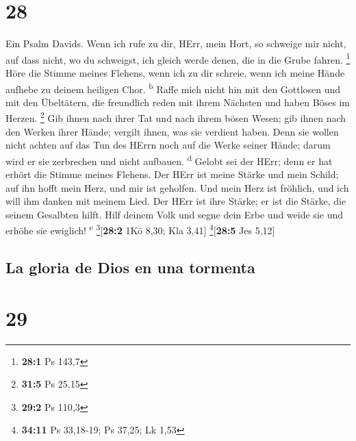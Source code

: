 \hypertarget{section-27}{%
\section{28}\label{section-27}}

 Ein Psalm Davids. Wenn ich rufe zu dir, HErr, mein Hort,
so schweige mir nicht, auf dass nicht, wo du schweigst, ich gleich werde
denen, die in die Grube fahren. \footnote{\textbf{28:1} Ps 143,7}
 Höre die Stimme meines Flehens, wenn ich zu dir schreie,
wenn ich meine Hände aufhebe zu deinem heiligen Chor.
\textsuperscript{b}  Raffe mich nicht hin mit den
Gottlosen und mit den Übeltätern, die freundlich reden mit ihrem
Nächsten und haben Böses im Herzen. \footnote{\textbf{31:5} Ps 25,15}
 Gib ihnen nach ihrer Tat und nach ihrem bösen Wesen; gib
ihnen nach den Werken ihrer Hände; vergilt ihnen, was sie verdient
haben.  Denn sie wollen nicht achten auf das Tun des HErrn
noch auf die Werke seiner Hände; darum wird er sie zerbrechen und nicht
aufbauen. \textsuperscript{d}  Gelobt sei der HErr; denn
er hat erhört die Stimme meines Flehens.  Der HErr ist
meine Stärke und mein Schild; auf ihn hofft mein Herz, und mir ist
geholfen. Und mein Herz ist fröhlich, und ich will ihm danken mit meinem
Lied.  Der HErr ist ihre Stärke; er ist die Stärke, die
seinem Gesalbten hilft.  Hilf deinem Volk und segne dein
Erbe und weide sie und erhöhe sie ewiglich! \textsuperscript{e}
\footnote{\textbf{29:2} Ps 110,3}{[}\textbf{28:2} 1Kö 8,30; Kla 3,41{]}
\footnote{\textbf{34:11} Ps 33,18-19; Ps 37,25; Lk 1,53}{[}\textbf{28:5}
Jes 5,12{]}

\hypertarget{la-gloria-de-dios-en-una-tormenta}{%
\subsection{La gloria de Dios en una
tormenta}\label{la-gloria-de-dios-en-una-tormenta}}

\hypertarget{section-28}{%
\section{29}\label{section-28}}

